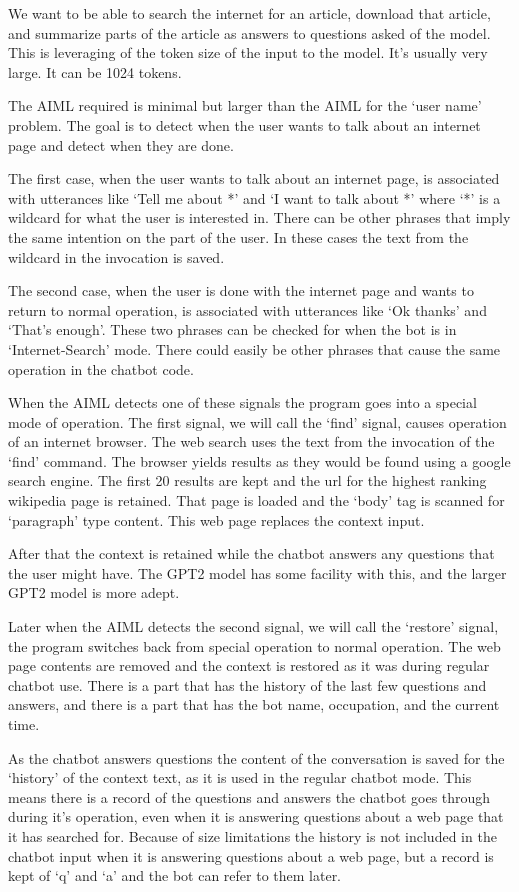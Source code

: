We want to be able to search the internet for an article, download that article, and summarize parts of the article as answers to questions asked of the model. This is leveraging of the token size of the input to the model. It's usually very large. It can be 1024 tokens.

The AIML required is minimal but larger than the AIML for the `user name' problem. The goal is to detect when the user wants to talk about an internet page and detect when they are done.

The first case, when the user wants to talk about an internet page, is associated with utterances like `Tell me about *' and `I want to talk about *' where `*' is a wildcard for what the user is interested in. There can be other phrases that imply the same intention on the part of the user. In these cases the text from the wildcard in the invocation is saved.

The second case, when the user is done with the internet page and wants to return to normal operation, is associated with utterances like `Ok thanks' and `That's enough'. These two phrases can be checked for when the bot is in `Internet-Search' mode. There could easily be other phrases that cause the same operation in the chatbot code.

When the AIML detects one of these signals the program goes into a special mode of operation. The first signal, we will call the `find' signal, causes operation of an internet browser. The web search uses the text from the invocation of the `find' command. The browser yields results as they would be found using a google search engine. The first 20 results are kept and the url for the highest ranking wikipedia page is retained. That page is loaded and the `body' tag is scanned for `paragraph' type content. This web page replaces the context input. 

After that the context is retained while the chatbot answers any questions that the user might have. The GPT2 model has some facility with this, and the larger GPT2 model is more adept.

Later when the AIML detects the second signal, we will call the `restore' signal, the program switches back from special operation to normal operation. The web page contents are removed and the context is restored as it was during regular chatbot use. There is a part that has the history of the last few questions and answers, and there is a part that has the bot name, occupation, and the current time.

As the chatbot answers questions the content of the conversation is saved for the `history' of the context text, as it is used in the regular chatbot mode. This means there is a record of the questions and answers the chatbot goes through during it's operation, even when it is answering questions about a web page that it has searched for. Because of size limitations the history is not included in the chatbot input when it is answering questions about a web page, but a record is kept of `q' and `a' and the bot can refer to them later.

